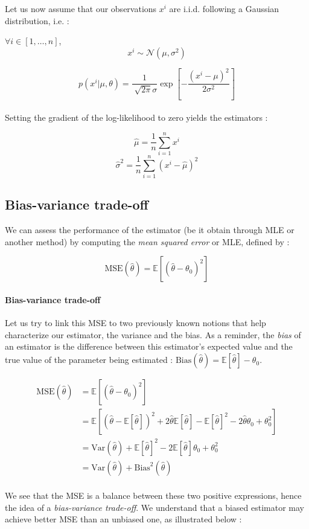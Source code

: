 \documentclass[a4paper,12pt]{article}
\begin{document}
Let us now assume that our observations $x^i$ are i.i.d. following a Gaussian distribution, i.e. : 

$\forall i \in [1,\dots,n]$,
\[x^i\sim\mathcal{N}(\mu,\sigma^2)\]

\[p(x^i|\mu,\theta)=\dfrac{1}{\sqrt[]{2\pi}\sigma}\exp\left[-\frac{(x^i-\mu)^2}{2\sigma^2}\right]\]
\\

Setting the gradient of the log-likelihood to zero yields the estimators :

\[ \hat{\mu} = \frac{1}{n} \sum_{i=1}^nx^i\]
\[ \hat{\sigma}^2 = \frac{1}{n} \sum_{i=1}^n (x^i-\hat{\mu})^2\]

\subsection{Bias-variance trade-off}

We can assess the performance of the estimator (be it obtain through MLE or another method) by computing the {\em mean squared error} or MLE, defined by :

\[\mbox{MSE}(\hat{\theta}) = \mathbb{E}[(\hat{\theta}-\theta_0)^2]\]

\paragraph{Bias-variance trade-off} Let us try to link this MSE to two previously known notions that help characterize our estimator, the variance and the bias. As a reminder, the {\em bias} of an estimator is the difference between this estimator's expected value and the true value of the parameter being estimated : $\mbox{Bias}(\hat{\theta})=\mathbb{E}[\hat{\theta}]-\theta_0$. 

\begin{align*}
\mbox{MSE}(\hat{\theta}) &= \mathbb{E}[(\hat{\theta}-\theta_0)^2]\\  
&= \mathbb{E}\left[(\hat{\theta}-\mathbb{E}[\hat{\theta}])^2+2\hat{\theta}\mathbb{E}[\hat{\theta}]-\mathbb{E}[\hat{\theta}]^2-2\hat{\theta}\theta_0+\theta_0^2\right]\\
&=\mbox{Var}(\hat{\theta})+\mathbb{E}[\hat{\theta}]^2-2\mathbb{E}[\hat{\theta}]\theta_0+\theta_0^2\\
&=\mbox{Var}(\hat{\theta})+\mbox{Bias}^2(\hat{\theta})
\end{align*}\\
We see that the MSE is a balance between these two positive expressions, hence the idea of a {\em bias-variance trade-off}. We understand that a biased estimator may achieve better MSE than an
unbiased one, as illustrated below :
\end{document}
